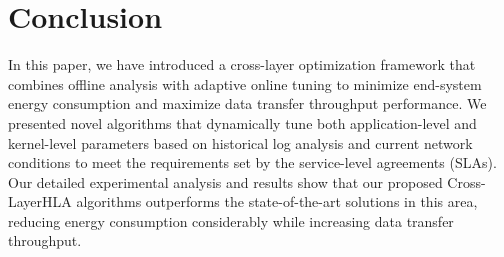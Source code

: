 \documentclass[conference]{IEEEtran}
\begin{document}






\section{Conclusion}
In this paper, we have introduced a cross-layer optimization framework that combines offline analysis with adaptive online tuning to minimize end-system energy consumption and maximize data transfer throughput performance. We presented novel algorithms that dynamically tune both application-level and kernel-level parameters based on historical log analysis and current network conditions to meet the requirements set by the service-level agreements (SLAs). Our detailed experimental analysis and results show that our proposed Cross-LayerHLA algorithms outperforms the state-of-the-art solutions in this area, reducing energy consumption considerably while increasing data transfer throughput.
\end{document}
